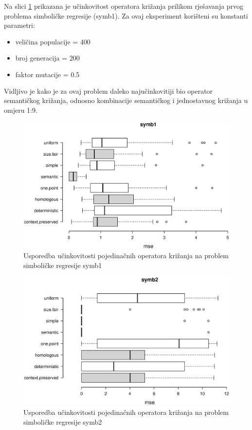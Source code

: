 Na slici \ref{symb1box} prikazana je učinkovitost operatora križanja prilikom rješavanja prvog problema simboličke regresije (symb1). Za ovaj eksperiment korišteni su konstanti parametri:
\begin{itemize}
\item{veličina populacije = 400}
\item{broj generacija = 200}
\item{faktor mutacije = 0.5}
\end{itemize}

Vidljivo je kako je za ovaj problem daleko najučinkovitiji bio operator semantičkog križanja, odnosno kombinacije semantičkog i jednostavnog križanja u omjeru 1:9. 

\begin{figure}[H]
	\centering
	\includegraphics[trim=0cm 4cm 0cm 0cm, scale=0.6]{./slike/boxPlots/symb1.eps}
	\caption{Usporedba učinkovitosti pojedinačnih operatora križanja na problem simboličke regresije symb1}
	\label{symb1box}
\end{figure}


\begin{figure}[H]
	\centering
	\includegraphics[trim=0cm 4cm 0cm 0cm, scale=0.6]{./slike/boxPlots/symb2.eps}
	\caption{Usporedba učinkovitosti pojedinačnih operatora križanja na problem simboličke regresije symb2}
	\label{symb2box}
\end{figure}


